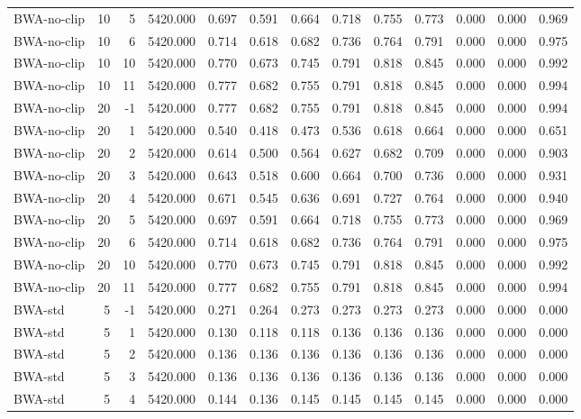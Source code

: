 \begin{table}
\begin{tabular}{lrrrrrrrrrrrr}
BWA-no-clip & 10 & 5 & 5420.000 & 0.697 & 0.591 & 0.664 & 0.718 & 0.755 & 0.773 & 0.000 & 0.000 & 0.969 \\
BWA-no-clip & 10 & 6 & 5420.000 & 0.714 & 0.618 & 0.682 & 0.736 & 0.764 & 0.791 & 0.000 & 0.000 & 0.975 \\
BWA-no-clip & 10 & 10 & 5420.000 & 0.770 & 0.673 & 0.745 & 0.791 & 0.818 & 0.845 & 0.000 & 0.000 & 0.992 \\
BWA-no-clip & 10 & 11 & 5420.000 & 0.777 & 0.682 & 0.755 & 0.791 & 0.818 & 0.845 & 0.000 & 0.000 & 0.994 \\
BWA-no-clip & 20 & -1 & 5420.000 & 0.777 & 0.682 & 0.755 & 0.791 & 0.818 & 0.845 & 0.000 & 0.000 & 0.994 \\
BWA-no-clip & 20 & 1 & 5420.000 & 0.540 & 0.418 & 0.473 & 0.536 & 0.618 & 0.664 & 0.000 & 0.000 & 0.651 \\
BWA-no-clip & 20 & 2 & 5420.000 & 0.614 & 0.500 & 0.564 & 0.627 & 0.682 & 0.709 & 0.000 & 0.000 & 0.903 \\
BWA-no-clip & 20 & 3 & 5420.000 & 0.643 & 0.518 & 0.600 & 0.664 & 0.700 & 0.736 & 0.000 & 0.000 & 0.931 \\
BWA-no-clip & 20 & 4 & 5420.000 & 0.671 & 0.545 & 0.636 & 0.691 & 0.727 & 0.764 & 0.000 & 0.000 & 0.940 \\
BWA-no-clip & 20 & 5 & 5420.000 & 0.697 & 0.591 & 0.664 & 0.718 & 0.755 & 0.773 & 0.000 & 0.000 & 0.969 \\
BWA-no-clip & 20 & 6 & 5420.000 & 0.714 & 0.618 & 0.682 & 0.736 & 0.764 & 0.791 & 0.000 & 0.000 & 0.975 \\
BWA-no-clip & 20 & 10 & 5420.000 & 0.770 & 0.673 & 0.745 & 0.791 & 0.818 & 0.845 & 0.000 & 0.000 & 0.992 \\
BWA-no-clip & 20 & 11 & 5420.000 & 0.777 & 0.682 & 0.755 & 0.791 & 0.818 & 0.845 & 0.000 & 0.000 & 0.994 \\
BWA-std & 5 & -1 & 5420.000 & 0.271 & 0.264 & 0.273 & 0.273 & 0.273 & 0.273 & 0.000 & 0.000 & 0.000 \\
BWA-std & 5 & 1 & 5420.000 & 0.130 & 0.118 & 0.118 & 0.136 & 0.136 & 0.136 & 0.000 & 0.000 & 0.000 \\
BWA-std & 5 & 2 & 5420.000 & 0.136 & 0.136 & 0.136 & 0.136 & 0.136 & 0.136 & 0.000 & 0.000 & 0.000 \\
BWA-std & 5 & 3 & 5420.000 & 0.136 & 0.136 & 0.136 & 0.136 & 0.136 & 0.136 & 0.000 & 0.000 & 0.000 \\
BWA-std & 5 & 4 & 5420.000 & 0.144 & 0.136 & 0.145 & 0.145 & 0.145 & 0.145 & 0.000 & 0.000 & 0.000 \\

\end{tabular}
\end{table}
